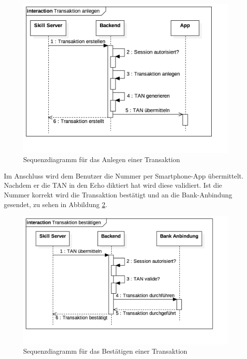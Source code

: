 \begin{figure}[!htb]
    \centering
    \includegraphics[width=1.0\textwidth]{bilder/4_sequenzTransaktionAnlegen.png}
    \caption{Sequenzdiagramm für das Anlegen einer Transaktion}
    \label{fig:sequenz-transaktion-anlegen}
\end{figure}

Im Anschluss wird dem Benutzer die Nummer per Smartphone-App übermittelt. Nachdem er die \ac{TAN} in den Echo diktiert hat wird diese validiert. Ist die Nummer korrekt wird die Transaktion bestätigt und an die Bank-Anbindung gesendet, zu sehen in Abbildung \ref{fig:sequenz-transaktion-bestaetigen}.\newpage 

\begin{figure}[!htb]
    \centering
    \includegraphics[width=1.0\textwidth]{bilder/4_sequenzTransaktionbestaetigen.png}
    \caption{Sequenzdiagramm für das Bestätigen einer Transaktion}
    \label{fig:sequenz-transaktion-bestaetigen}
\end{figure}

